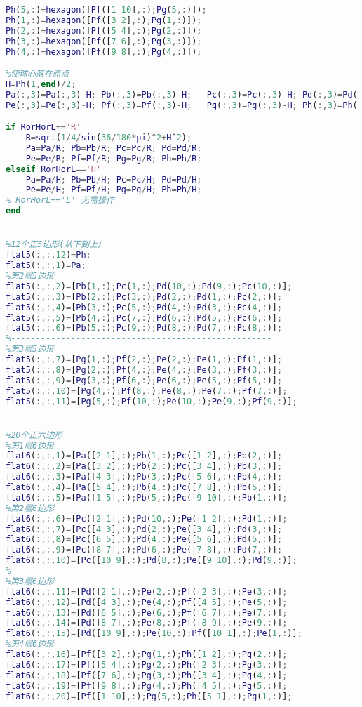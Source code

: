 \begin{lstlisting}[language=matlab, caption=body60.m]
%第3层6边形
Ph(5,:)=hexagon([Pf([1 10],:);Pg(5,:)]);
Ph(1,:)=hexagon([Pf([3 2],:);Pg(1,:)]);
Ph(2,:)=hexagon([Pf([5 4],:);Pg(2,:)]);
Ph(3,:)=hexagon([Pf([7 6],:);Pg(3,:)]);
Ph(4,:)=hexagon([Pf([9 8],:);Pg(4,:)]);

%使球心落在原点
H=Ph(1,end)/2;
Pa(:,3)=Pa(:,3)-H; Pb(:,3)=Pb(:,3)-H;   Pc(:,3)=Pc(:,3)-H; Pd(:,3)=Pd(:,3)-H;
Pe(:,3)=Pe(:,3)-H; Pf(:,3)=Pf(:,3)-H;   Pg(:,3)=Pg(:,3)-H; Ph(:,3)=Ph(:,3)-H; 

if RorHorL=='R'
    R=sqrt(1/4/sin(36/180*pi)^2+H^2);
    Pa=Pa/R; Pb=Pb/R; Pc=Pc/R; Pd=Pd/R; 
    Pe=Pe/R; Pf=Pf/R; Pg=Pg/R; Ph=Ph/R; 
elseif RorHorL=='H'
    Pa=Pa/H; Pb=Pb/H; Pc=Pc/H; Pd=Pd/H; 
    Pe=Pe/H; Pf=Pf/H; Pg=Pg/H; Ph=Ph/H; 
% RorHorL=='L' 无需操作
end


%12个正5边形(从下到上)
flat5(:,:,12)=Ph;
flat5(:,:,1)=Pa;
%第2层5边形
flat5(:,:,2)=[Pb(1,:);Pc(1,:);Pd(10,:);Pd(9,:);Pc(10,:)];
flat5(:,:,3)=[Pb(2,:);Pc(3,:);Pd(2,:);Pd(1,:);Pc(2,:)];
flat5(:,:,4)=[Pb(3,:);Pc(5,:);Pd(4,:);Pd(3,:);Pc(4,:)];
flat5(:,:,5)=[Pb(4,:);Pc(7,:);Pd(6,:);Pd(5,:);Pc(6,:)];
flat5(:,:,6)=[Pb(5,:);Pc(9,:);Pd(8,:);Pd(7,:);Pc(8,:)];
%----------------------------------------------------
%第3层5边形
flat5(:,:,7)=[Pg(1,:);Pf(2,:);Pe(2,:);Pe(1,:);Pf(1,:)];
flat5(:,:,8)=[Pg(2,:);Pf(4,:);Pe(4,:);Pe(3,:);Pf(3,:)];
flat5(:,:,9)=[Pg(3,:);Pf(6,:);Pe(6,:);Pe(5,:);Pf(5,:)];
flat5(:,:,10)=[Pg(4,:);Pf(8,:);Pe(8,:);Pe(7,:);Pf(7,:)];
flat5(:,:,11)=[Pg(5,:);Pf(10,:);Pe(10,:);Pe(9,:);Pf(9,:)];


%20个正六边形
%第1层6边形
flat6(:,:,1)=[Pa([2 1],:);Pb(1,:);Pc([1 2],:);Pb(2,:)];
flat6(:,:,2)=[Pa([3 2],:);Pb(2,:);Pc([3 4],:);Pb(3,:)];
flat6(:,:,3)=[Pa([4 3],:);Pb(3,:);Pc([5 6],:);Pb(4,:)];
flat6(:,:,4)=[Pa([5 4],:);Pb(4,:);Pc([7 8],:);Pb(5,:)];
flat6(:,:,5)=[Pa([1 5],:);Pb(5,:);Pc([9 10],:);Pb(1,:)];
%第2层6边形
flat6(:,:,6)=[Pc([2 1],:);Pd(10,:);Pe([1 2],:);Pd(1,:)];
flat6(:,:,7)=[Pc([4 3],:);Pd(2,:);Pe([3 4],:);Pd(3,:)];
flat6(:,:,8)=[Pc([6 5],:);Pd(4,:);Pe([5 6],:);Pd(5,:)];
flat6(:,:,9)=[Pc([8 7],:);Pd(6,:);Pe([7 8],:);Pd(7,:)];
flat6(:,:,10)=[Pc([10 9],:);Pd(8,:);Pe([9 10],:);Pd(9,:)];
%-------------------------------------------------
%第3层6边形
flat6(:,:,11)=[Pd([2 1],:);Pe(2,:);Pf([2 3],:);Pe(3,:)];
flat6(:,:,12)=[Pd([4 3],:);Pe(4,:);Pf([4 5],:);Pe(5,:)];
flat6(:,:,13)=[Pd([6 5],:);Pe(6,:);Pf([6 7],:);Pe(7,:)];
flat6(:,:,14)=[Pd([8 7],:);Pe(8,:);Pf([8 9],:);Pe(9,:)];
flat6(:,:,15)=[Pd([10 9],:);Pe(10,:);Pf([10 1],:);Pe(1,:)];
%第4层6边形
flat6(:,:,16)=[Pf([3 2],:);Pg(1,:);Ph([1 2],:);Pg(2,:)];
flat6(:,:,17)=[Pf([5 4],:);Pg(2,:);Ph([2 3],:);Pg(3,:)];
flat6(:,:,18)=[Pf([7 6],:);Pg(3,:);Ph([3 4],:);Pg(4,:)];
flat6(:,:,19)=[Pf([9 8],:);Pg(4,:);Ph([4 5],:);Pg(5,:)];
flat6(:,:,20)=[Pf([1 10],:);Pg(5,:);Ph([5 1],:);Pg(1,:)];



\end{lstlisting}
